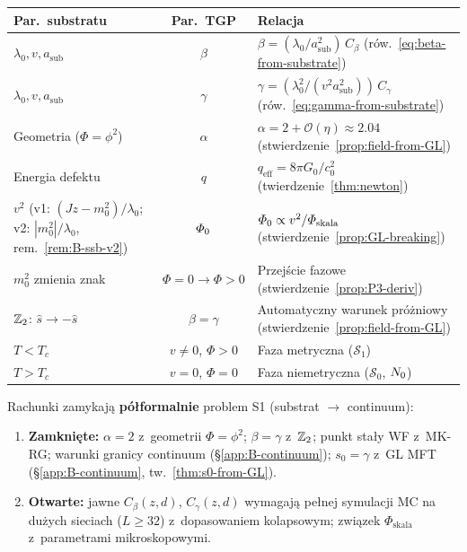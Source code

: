 \begin{center}
\small
\begin{tabular}{@{}>{\raggedright}p{3.2cm}cp{7cm}@{}}
\toprule
\textbf{Par.\ substratu} & \textbf{Par.\ TGP} & \textbf{Relacja} \\
\midrule
$\lambda_0, v, a_{\mathrm{sub}}$
  & $\beta$ & $\beta = (\lambda_0/a_{\mathrm{sub}}^2)\,C_\beta$
    (r\'ow.~\ref{eq:beta-from-substrate}) \\
$\lambda_0, v, a_{\mathrm{sub}}$
  & $\gamma$ & $\gamma = (\lambda_0^2/(v^2 a_{\mathrm{sub}}^2))\,C_\gamma$
    (r\'ow.~\ref{eq:gamma-from-substrate}) \\
Geometria ($\Phi = \phi^2$)
  & $\alpha$ & $\alpha = 2 + \mathcal{O}(\eta) \approx 2.04$
    (stwierdzenie~\ref{prop:field-from-GL}) \\
Energia defektu
  & $q$ & $q_{\mathrm{eff}} = 8\pi G_0/c_0^2$
    (twierdzenie~\ref{thm:newton}) \\
$v^2$ (v1: $(Jz-m_0^2)/\lambda_0$; v2: $|m_0^2|/\lambda_0$, rem.~\ref{rem:B-ssb-v2})
  & $\varPhi_0$ & $\varPhi_0 \propto v^2 / \varPhi_{\mathrm{skala}}$
    (stwierdzenie~\ref{prop:GL-breaking}) \\
$m_0^2$ zmienia znak
  & $\Phi = 0 \to \Phi > 0$ & Przej\'scie fazowe
    (stwierdzenie~\ref{prop:P3-deriv}) \\
$\mathbb{Z}_2$: $\hat{s} \to -\hat{s}$
  & $\beta = \gamma$ & Automatyczny warunek pr\'o\.zniowy
    (stwierdzenie~\ref{prop:field-from-GL}) \\
$T < T_c$
  & $v \neq 0$, $\Phi > 0$ & Faza metryczna ($\mathcal{S}_1$) \\
$T > T_c$
  & $v = 0$, $\Phi = 0$ & Faza niemetryczna ($\mathcal{S}_0$, $N_0$) \\
\bottomrule
\end{tabular}
\end{center}

\begin{remark}\label{rem:B-open}
Rachunki zamykaj\k{a} \textbf{p\'o\l{}formalnie}
problem S1 (substrat $\to$ continuum):
\begin{enumerate}[nosep]
  \item \textbf{Zamkni\k{e}te:} $\alpha = 2$ z~geometrii
    $\Phi = \phi^2$; $\beta = \gamma$ z~$\mathbb{Z}_2$;
    punkt sta\l{}y WF z~MK-RG; warunki granicy continuum
    (\S\ref{app:B-continuum}); $s_0 = \gamma$ z~GL MFT
    (\S\ref{app:B-continuum}, tw.~\ref{thm:s0-from-GL}).
  \item \textbf{Otwarte:} jawne $C_\beta(z, d)$,
    $C_\gamma(z, d)$ wymagaj\k{a} pe\l{}nej symulacji MC
    na du\.zych sieciach ($L \geq 32$) z~dopasowaniem
    kolapsowym; zwi\k{a}zek $\Phi_{\mathrm{skala}}$
    z~parametrami mikro\-skopowymi.
\end{enumerate}
\end{remark}

